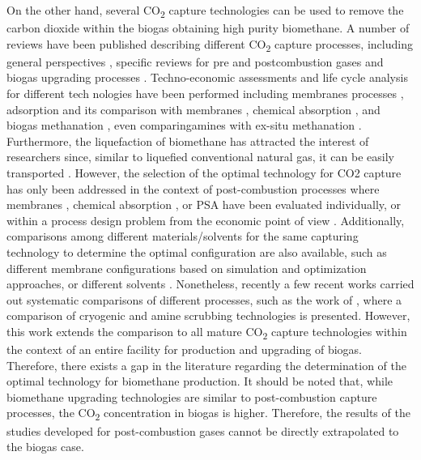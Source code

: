\begin{refsection}[referencesCh7]
On the other hand, several CO\textsubscript{2} capture technologies can be used to remove the carbon dioxide within the biogas obtaining high purity biomethane. A number of reviews have been published describing different CO\textsubscript{2} capture processes, including general perspectives \citep{adamu2020process}, specific reviews for pre and postcombustion gases \citep{macdowell2010overview} and biogas upgrading processes \citep{adnan2019technologies, miltner2017review}. Techno-economic assessments and life cycle analysis for different tech nologies have been performed including membranes processes \citep{fang2018life}, adsorption and its comparison with membranes \citep{giordano2018life}, chemical absorption \citep{morero2017evaluation}, and biogas methanation \citep{curto2019renewable}, even comparingamines  with ex-situ methanation \citep{vo2018techno}. Furthermore, the liquefaction of biomethane has attracted the interest of researchers since, similar to liquefied conventional natural gas, it can be easily transported \citep{qyyum2020biogas}. However, the selection of the optimal technology for CO2 capture has only been addressed in the context of post-combustion processes where membranes \citep{gassner2009integrated}, chemical absorption \citep{hasan2012modelinga}, or PSA \citep{hasan2012modelingb} have been evaluated individually, or within a process design problem from the economic point of view \citep{klemevs2007techno}. Additionally, comparisons among different materials/solvents for the same capturing technology to determine the optimal configuration are also available, such as different membrane configurations based on simulation \citep{makaruk2010membrane} and optimization \citep{gilassi2019optimizing} approaches, or different solvents \citep{lee2013comparisons}. Nonetheless, recently a few recent works carried out systematic comparisons of different processes, such as the work of \citet{pellegrini2018biogas}, where a comparison of cryogenic and amine scrubbing technologies is presented. However, this work extends the comparison to all mature CO\textsubscript{2} capture technologies within the context of an entire facility for production and upgrading of biogas. Therefore, there exists a gap in the literature regarding the determination of the optimal technology for biomethane production. It should be noted that, while biomethane upgrading technologies are similar to post-combustion capture processes, the CO\textsubscript{2} concentration in biogas is higher. Therefore, the results of the studies developed for post-combustion gases cannot be directly extrapolated to the biogas case.


\end{refsection}
